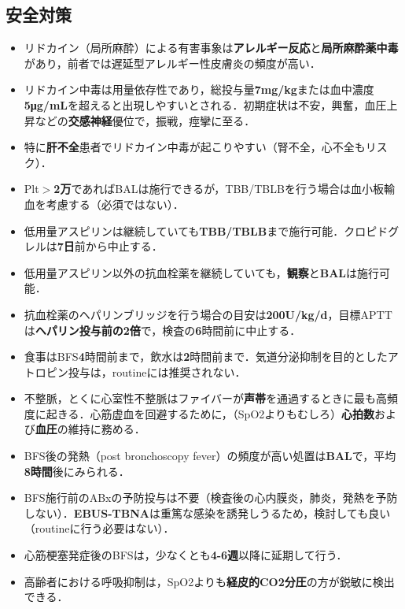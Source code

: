 \subsection{安全対策}

\begin{itemize}
\item リドカイン（局所麻酔）による有害事象は\textbf{アレルギー反応}と\textbf{局所麻酔薬中毒}があり，前者では遅延型アレルギー性皮膚炎の頻度が高い．
\item リドカイン中毒は用量依存性であり，総投与量\textbf{7mg/kg}または血中濃度\textbf{5μg/mL}を超えると出現しやすいとされる．初期症状は不安，興奮，血圧上昇などの\textbf{交感神経}優位で，振戦，痙攣に至る．
\item 特に\textbf{肝不全}患者でリドカイン中毒が起こりやすい（腎不全，心不全もリスク）．
\item Plt$>$\textbf{2万}であればBALは施行できるが，TBB/TBLBを行う場合は血小板輸血を考慮する（必須ではない）．
\item 低用量アスピリンは継続していても\textbf{TBB/TBLB}まで施行可能．クロピドグレルは\textbf{7日}前から中止する．
\item 低用量アスピリン以外の抗血栓薬を継続していても，\textbf{観察}と\textbf{BAL}は施行可能．
\item 抗血栓薬のヘパリンブリッジを行う場合の目安は\textbf{200U/kg/d}，目標APTTは\textbf{ヘパリン投与前の2倍}で，検査の\textbf{6}時間前に中止する．
\item 食事はBFS\textbf{4}時間前まで，飲水は\textbf{2}時間前まで．気道分泌抑制を目的としたアトロピン投与は，routineには推奨されない．
\item 不整脈，とくに心室性不整脈はファイバーが\textbf{声帯}を通過するときに最も高頻度に起きる．心筋虚血を回避するために，（SpO2よりもむしろ）\textbf{心拍数}および\textbf{血圧}の維持に務める．
\item BFS後の発熱（post bronchoscopy fever）の頻度が高い処置は\textbf{BAL}で，平均\textbf{8時間}後にみられる．
\item BFS施行前のABxの予防投与は不要（検査後の心内膜炎，肺炎，発熱を予防しない）．\textbf{EBUS-TBNA}は重篤な感染を誘発しうるため，検討しても良い（routineに行う必要はない）．
\item 心筋梗塞発症後のBFSは，少なくとも\textbf{4-6週}以降に延期して行う．
\item 高齢者における呼吸抑制は，SpO2よりも\textbf{経皮的CO2分圧}の方が鋭敏に検出できる．


\end{itemize}

